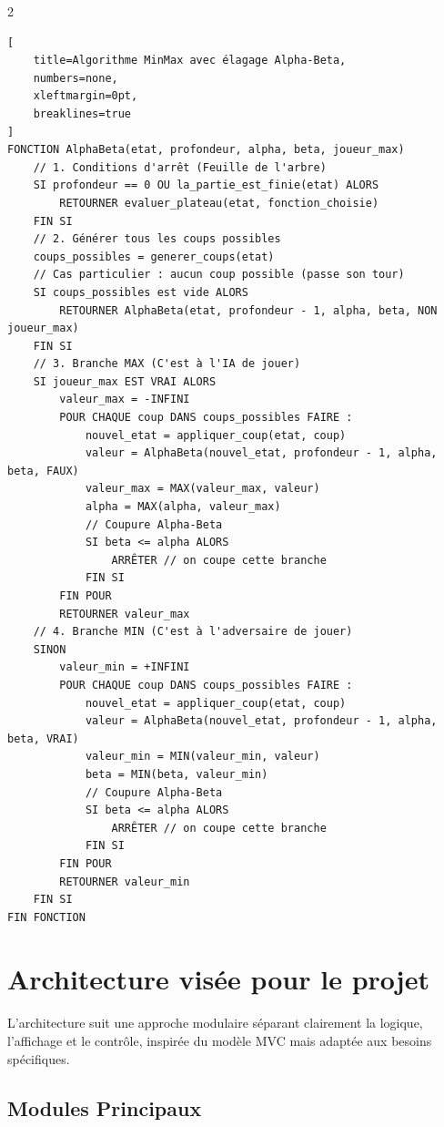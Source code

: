 \documentclass[a4paper]{article}
\begin{document}
\begin{multicols}{2}
\begin{lstlisting}[
    title=Algorithme MinMax avec élagage Alpha-Beta,
    numbers=none,
    xleftmargin=0pt,
    breaklines=true
]
FONCTION AlphaBeta(etat, profondeur, alpha, beta, joueur_max)
    // 1. Conditions d'arrêt (Feuille de l'arbre)
    SI profondeur == 0 OU la_partie_est_finie(etat) ALORS
        RETOURNER evaluer_plateau(etat, fonction_choisie)
    FIN SI
    // 2. Générer tous les coups possibles
    coups_possibles = generer_coups(etat)
    // Cas particulier : aucun coup possible (passe son tour)
    SI coups_possibles est vide ALORS
        RETOURNER AlphaBeta(etat, profondeur - 1, alpha, beta, NON joueur_max)
    FIN SI
    // 3. Branche MAX (C'est à l'IA de jouer)
    SI joueur_max EST VRAI ALORS
        valeur_max = -INFINI
        POUR CHAQUE coup DANS coups_possibles FAIRE :
            nouvel_etat = appliquer_coup(etat, coup)
            valeur = AlphaBeta(nouvel_etat, profondeur - 1, alpha, beta, FAUX)
            valeur_max = MAX(valeur_max, valeur)
            alpha = MAX(alpha, valeur_max)
            // Coupure Alpha-Beta
            SI beta <= alpha ALORS
                ARRÊTER // on coupe cette branche
            FIN SI
        FIN POUR
        RETOURNER valeur_max
    // 4. Branche MIN (C'est à l'adversaire de jouer)
    SINON
        valeur_min = +INFINI
        POUR CHAQUE coup DANS coups_possibles FAIRE :
            nouvel_etat = appliquer_coup(etat, coup)
            valeur = AlphaBeta(nouvel_etat, profondeur - 1, alpha, beta, VRAI)
            valeur_min = MIN(valeur_min, valeur)
            beta = MIN(beta, valeur_min)
            // Coupure Alpha-Beta
            SI beta <= alpha ALORS
                ARRÊTER // on coupe cette branche
            FIN SI
        FIN POUR
        RETOURNER valeur_min
    FIN SI
FIN FONCTION
\end{lstlisting}
\end{multicols}
\section{Architecture visée pour le projet}

L'architecture suit une approche modulaire séparant clairement la logique, l'affichage et le contrôle, inspirée du modèle MVC mais adaptée aux besoins spécifiques. 

\subsection{Modules Principaux}
\end{document}
